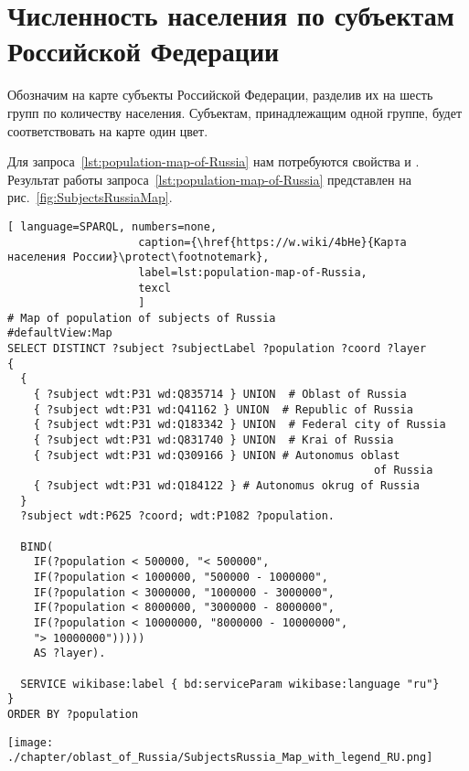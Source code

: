 \newpage
\section{Численность населения по субъектам Российской Федерации}

Обозначим на карте субъекты Российской Федерации, 
разделив их на шесть групп по количеству населения. 
Субъектам, принадлежащим одной группе, будет соответствовать на карте один цвет.

Для запроса~\ref{lst:population-map-of-Russia} нам потребуются свойства  
и .
Результат работы запроса~\ref{lst:population-map-of-Russia} представлен на рис.~\ref{fig:SubjectsRussiaMap}.


\begin{lstlisting}[ language=SPARQL, numbers=none,
                    caption={\href{https://w.wiki/4bHe}{Карта населения России}\protect\footnotemark},
                    label=lst:population-map-of-Russia,
                    texcl 
                    ]
# Map of population of subjects of Russia
#defaultView:Map
SELECT DISTINCT ?subject ?subjectLabel ?population ?coord ?layer
{
  {
    { ?subject wdt:P31 wd:Q835714 } UNION  # Oblast of Russia
    { ?subject wdt:P31 wd:Q41162 } UNION  # Republic of Russia
    { ?subject wdt:P31 wd:Q183342 } UNION  # Federal city of Russia
    { ?subject wdt:P31 wd:Q831740 } UNION  # Krai of Russia
    { ?subject wdt:P31 wd:Q309166 } UNION # Autonomus oblast 
                                                        of Russia
    { ?subject wdt:P31 wd:Q184122 } # Autonomus okrug of Russia
  }   
  ?subject wdt:P625 ?coord; wdt:P1082 ?population.
  
  BIND(
    IF(?population < 500000, "< 500000",
    IF(?population < 1000000, "500000 - 1000000",
    IF(?population < 3000000, "1000000 - 3000000",
    IF(?population < 8000000, "3000000 - 8000000",
    IF(?population < 10000000, "8000000 - 10000000",
    "> 10000000")))))
    AS ?layer).
  
  SERVICE wikibase:label { bd:serviceParam wikibase:language "ru"}
}
ORDER BY ?population
\end{lstlisting}%


\begin{fullwidth}
\begin{figure*}[h]
	\texttt{[image: ./chapter/oblast\_of\_Russia/SubjectsRussia\_Map\_with\_legend\_RU.png]}
    \caption[Численность населения по субъектам России, 2021 год.]{Численность населения в субъектах России, 2021 год}%
      \label{fig:SubjectsRussiaMap}%
\end{figure*} 
\end{fullwidth}

